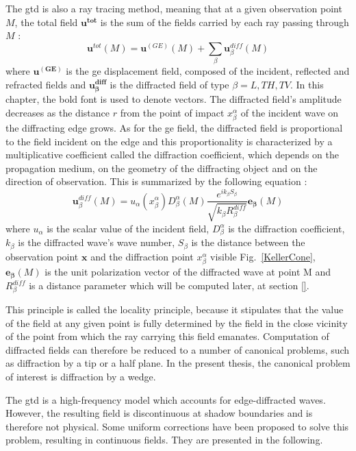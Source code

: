The \acrshort{gtd} is also a ray tracing method, meaning that at a given observation point $M$, the total field $\mathbf{u^{tot}}$ is the sum of the fields carried by each ray passing through $M$ :
\begin{equation}
    \mathbf{u}^{tot}(M)=\mathbf{u}^{(GE)}(M)+\sum_{\beta} \mathbf{u}^{diff}_{\beta}(M)
    \label{GTDtot}
\end{equation}
where $\mathbf{u^{(GE)}}$ is the \acrshort{ge} displacement field, composed of the incident, reflected and refracted fields and $\mathbf{u^{diff}_{\beta}}$ is the diffracted field of type $\beta=L,TH,TV$. In this chapter, the bold font is used to denote vectors. The diffracted field's amplitude decreases as the distance $r$ from the point of impact $x_{\beta}^{\alpha}$ of the incident wave on the diffracting edge grows. As for the \acrshort{ge} field, the diffracted field is proportional to the field incident on the edge and this proportionality is characterized by a multiplicative coefficient called the diffraction coefficient, which depends on the propagation medium, on the geometry of the diffracting object and on the direction of observation. This is summarized by the following equation :
\begin{equation}
    \mathbf{u}_{\beta}^{diff}(M)=u_{\alpha}(x_{\beta}^{\alpha})D_{\beta}^{\alpha}(M)\dfrac{e^{ik_{\beta}S_{\beta}}}{\sqrt{k_{\beta}R_{\beta}^{diff}}}\mathbf{e_{\beta}}(M)
\end{equation}
where $u_{\alpha}$ is the scalar value of the incident field, $D_{\beta}^{\alpha}$ is the diffraction coefficient, $k_{\beta}$ is the diffracted wave's wave number, $S_{\beta}$ is the distance between the observation point $\mathbf{x}$ and the diffraction point $x_{\beta}^{\alpha}$ visible Fig.~\ref{KellerCone}, $\mathbf{e_{\beta}}(M)$ is the unit polarization vector of the diffracted wave at point M and $R_{\beta}^{diff}$ is a distance parameter which will be computed later, at section \ref{}.

This principle is called the locality principle, because it stipulates that the value of the field at any given point is fully determined by the field in the close vicinity of the point from which the ray carrying this field emanates. Computation of diffracted fields can therefore be reduced to a number of canonical problems, such as diffraction by a tip or a half plane. In the present thesis, the canonical problem of interest is diffraction by a wedge.

The \acrshort{gtd} is a high-frequency model which accounts for edge-diffracted waves. However, the resulting field is discontinuous at shadow boundaries and is therefore not physical. Some uniform corrections have been proposed to solve this problem, resulting in continuous fields. They are presented in the following. 

